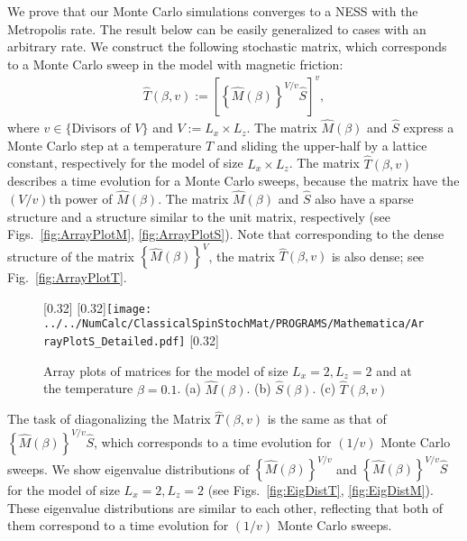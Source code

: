We prove that our Monte Carlo simulations converges to a NESS with the Metropolis rate. The result below can be easily generalized to cases with an arbitrary rate. We construct the following stochastic matrix, which corresponds to a Monte Carlo sweep in the model with magnetic friction:
\begin{align}
\hat{T}(\beta,v):=\left[\left\{\hat{M}(\beta)\right\}^{V/v}\hat{S}\right]^{v},
\end{align}
where $v\in\{\text{Divisors of }V\}$ and $V:=L_{x}\times L_{z}$. The matrix $\hat{M}(\beta)$ and $\hat{S}$ express a Monte Carlo step at a temperature $T$ and sliding the upper-half by a lattice constant, respectively for the model of size $L_{x}\times L_{z}$. The matrix $\hat{T}(\beta,v)$ describes a time evolution for a Monte Carlo sweeps, because the matrix have the $(V/v)$th power of $\hat{M}(\beta)$. The matrix $\hat{M}(\beta)$ and $\hat{S}$ also have a sparse structure and a structure similar to the unit matrix, respectively (see Figs.~\ref{fig:ArrayPlotM}, \ref{fig:ArrayPlotS}). Note that corresponding to the dense structure of the matrix $\left\{\hat{M}(\beta)\right\}^{V}$, the matrix $\hat{T}(\beta,v)$ is also dense; see Fig.~\ref{fig:ArrayPlotT}. 

\begin{figure}[htbp]
	\centering
	\subcaptionbox{\label{fig:ArrayPlotM}}[0.32\linewidth]{\missingfigure[figwidth=0.3\linewidth]{}}
	\subcaptionbox{\label{fig:ArrayPlotS}}[0.32\linewidth]{\texttt{[image: ../../NumCalc/ClassicalSpinStochMat/PROGRAMS/Mathematica/ArrayPlotS\_Detailed.pdf]}}
	\subcaptionbox{\label{fig:ArrayPlotT}}[0.32\linewidth]{\missingfigure[figwidth=0.3\linewidth]{}}
	
	\caption{Array plots of matrices for the model of size $L_{x}=2, L_{z}=2$ and at the temperature $\beta=0.1$. (a) $\hat{M}(\beta)$. (b) $\hat{S}(\beta)$. (c) $\hat{T}(\beta,v)$}
\end{figure}

The task of diagonalizing the Matrix $\hat{T}(\beta,v)$ is the same as that of $\left\{\hat{M}(\beta)\right\}^{V/v}\hat{S}$, which corresponds to a time evolution for $(1/v)$ Monte Carlo sweeps. We show eigenvalue distributions of $\left\{\hat{M}(\beta)\right\}^{V/v}$ and $\left\{\hat{M}(\beta)\right\}^{V/v}\hat{S}$ for the model of size $L_{x}=2,L_{z}=2$ (see Figs.~\ref{fig:EigDistT}, \ref{fig:EigDistM}). These eigenvalue distributions are similar to each other, reflecting that both of them correspond to 
 a time evolution for $(1/v)$ Monte Carlo sweeps.
 

